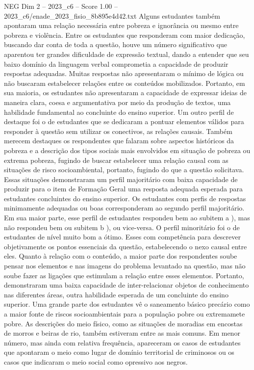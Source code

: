 \begin{textsample}{NEG Dim 2 – 2023\_c6 – Score 1.00 – 2023\_c6/enade\_2023\_fisio\_8b895e4d42.txt}
Alguns estudantes também apontaram uma relação necessária entre pobreza e ignorância ou mesmo entre pobreza e violência.
Entre os estudantes que responderam com maior dedicação, buscando dar conta de toda a questão, houve um número significativo que aparentou ter grandes dificuldade de expressão textual, dando a entender que seu baixo domínio da linguagem verbal comprometia a capacidade de produzir respostas adequadas.
Muitas respostas não apresentaram o mínimo de lógica ou não buscaram estabelecer relações entre os conteúdos mobilizados.
Portanto, em sua maioria, os estudantes não apresentaram a capacidade de expressar ideias de maneira clara, coesa e argumentativa por meio da produção de textos, uma habilidade fundamental ao concluinte do ensino superior.
Um outro perfil de destaque foi o de estudantes que se dedicaram a pontuar elementos válidos para responder à questão sem utilizar os conectivos, as relações causais.
Também merecem destaques os respondentes que falaram sobre aspectos históricos da pobreza e a descrição dos tipos sociais mais envolvidos em situação de pobreza ou extrema pobreza, fugindo de buscar estabelecer uma relação causal com as situações de risco socioambiental, portanto, fugindo do que a questão solicitava.
Essas situações demonstraram um perfil majoritário com baixa capacidade de produzir para o item de Formação Geral uma resposta adequada esperada para estudantes concluintes do ensino superior.
Os estudantes com perfis de respostas minimamente adequadas ou boas corresponderam ao segundo perfil majoritário.
Em sua maior parte, esse perfil de estudantes respondeu bem ao subitem a ), mas não respondeu bem ou subitem b ), ou vice-versa.
O perfil minoritário foi o de estudantes de nível muito bom a ótimo.
Esses com competência para descrever objetivamente os pontos essenciais da questão, estabelecendo o nexo causal entre eles.
Quanto à relação com o conteúdo, a maior parte dos respondentes soube pensar nos elementos e nas imagens do problema levantado na questão, mas não soube fazer as ligações que estimulam a relação entre esses elementos.
Portanto, demonstraram uma baixa capacidade de inter-relacionar objetos de conhecimento nas diferentes áreas, outra habilidade esperada de um concluinte do ensino superior.
Uma grande parte dos estudantes vê o saneamento básico precário como a maior fonte de riscos socioambientais para a população pobre ou extremamete pobre.
As descrições do meio físico, como as situações de moradias em encostas de morros e beiras de rio, também estiveram entre as mais comuns.
Em menor número, mas ainda com relativa frequência, apareceram os casos de estudantes que apontaram o meio como lugar de domínio territorial de criminosos ou os casos que indicaram o meio social como opressivo aos negros.

\end{textsample}
